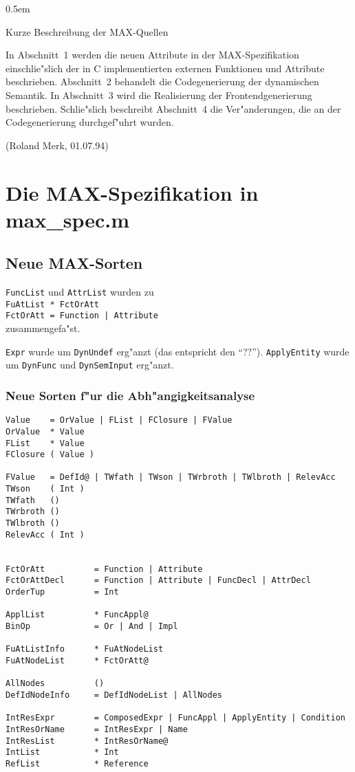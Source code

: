 \pagestyle{headings}


\parskip 0.5em
\parindent 0pt

{\LARGE\bf\centerline{Kurze Beschreibung der MAX-Quellen}}

In Abschnitt~1 werden die neuen Attribute in der MAX-Spezifikation einschlie"slich
der in C implementierten externen Funktionen und Attribute beschrieben.
Abschnitt~2 behandelt die Codegenerierung der dynamischen Semantik.
In Abschnitt~3 wird die Realisierung der Frontendgenerierung beschrieben.
Schlie"slich beschreibt Abschnitt~4 die Ver"anderungen, die an der Codegenerierung
durchgef"uhrt wurden.


\bigskip (Roland Merk, 01.07.94)
\tableofcontents

\newpage
\section{Die MAX-Spezifikation in max\_spec.m}


\subsection{Neue MAX-Sorten}

{\tt FuncList} und {\tt AttrList} wurden zu\\
{\tt FuAtList * FctOrAtt\\
     FctOrAtt = Function | Attribute}\\
zusammengefa"st.


{\tt Expr} wurde um {\tt DynUndef} erg"anzt (das entspricht den "`??"').
{\tt ApplyEntity} wurde um {\tt DynFunc} und {\tt DynSemInput} erg"anzt.


\subsubsection{Neue Sorten f"ur die Abh"angigkeitsanalyse}

\begin{verbatim}
Value    = OrValue | FList | FClosure | FValue
OrValue  * Value
FList    * Value
FClosure ( Value )

FValue   = DefId@ | TWfath | TWson | TWrbroth | TWlbroth | RelevAcc
TWson    ( Int )
TWfath   ()
TWrbroth ()
TWlbroth ()
RelevAcc ( Int )


FctOrAtt          = Function | Attribute
FctOrAttDecl      = Function | Attribute | FuncDecl | AttrDecl
OrderTup          = Int

ApplList          * FuncAppl@
BinOp             = Or | And | Impl

FuAtListInfo      * FuAtNodeList
FuAtNodeList      * FctOrAtt@

AllNodes          ()
DefIdNodeInfo     = DefIdNodeList | AllNodes

IntResExpr        = ComposedExpr | FuncAppl | ApplyEntity | Condition
IntResOrName      = IntResExpr | Name
IntResList        * IntResOrName@
IntList           * Int
RefList           * Reference
\end{verbatim}

